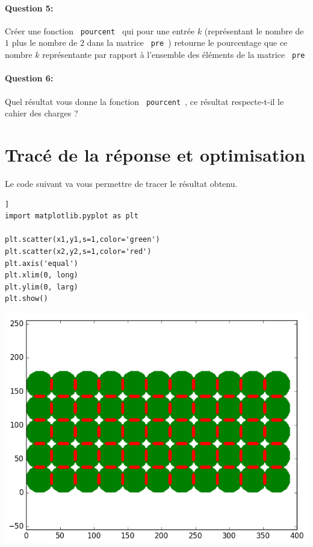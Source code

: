 \paragraph{Question 5:} Créer une fonction \verb? pourcent ? qui pour une entrée $k$ (représentant le nombre de $1$ plus le nombre de $2$ dans la matrice \verb? pre ?) retourne le pourcentage que ce nombre $k$ représentante par rapport à l'ensemble des éléments de la matrice \verb? pre ?

\paragraph{Question 6:} Quel résultat vous donne la fonction \verb? pourcent ?, ce résultat respecte-t-il le cahier des charges ?

\section{Tracé de la réponse et optimisation}

Le code suivant va vous permettre de tracer le résultat obtenu.

\begin{minipage}{0.45\linewidth}
\begin{verbatim}]
import matplotlib.pyplot as plt

plt.scatter(x1,y1,s=1,color='green')
plt.scatter(x2,y2,s=1,color='red')
plt.axis('equal')
plt.xlim(0, long)
plt.ylim(0, larg)
plt.show()
\end{verbatim}
\end{minipage}\hfill
\begin{minipage}{0.45\linewidth}
\begin{center}
 \includegraphics[width=0.8\linewidth]{img/Figure2}
\end{center}
\end{minipage}

